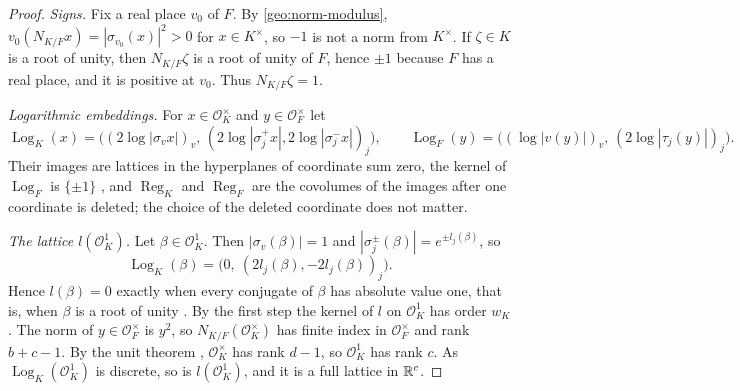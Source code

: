 \begin{proof}
\emph{Signs.} Fix a real place $v_0$ of $F$. By
\eqref{geo:norm-modulus}, $v_0(N_{K/F}x)=|\sigma_{v_0}(x)|^2>0$ for
$x\in K^\times$, so $-1$ is not a norm from $K^\times$. If $\zeta\in K$
is a root of unity, then $N_{K/F}\zeta$ is a root of unity of $F$,
hence $\pm1$ because $F$ has a real place, and it is positive at $v_0$.
Thus $N_{K/F}\zeta=1$.

\emph{Logarithmic embeddings.} For $x\in\mathcal O_K^\times$ and
$y\in\mathcal O_F^\times$ let
\[
 \operatorname{Log}_K(x)=\bigl((2\log|\sigma_vx|)_v,\,(2\log|\sigma_j^+x|,
 2\log|\sigma_j^-x|)_j\bigr),\qquad
 \operatorname{Log}_F(y)=\bigl((\log|v(y)|)_v,\,(2\log|\tau_j(y)|)_j\bigr).
\]
Their images are lattices in the hyperplanes of coordinate sum zero,
the kernel of $\operatorname{Log}_F$ is $\{\pm1\}$
\cite[Proposition~5.8]{MilneANT}, and $\operatorname{Reg}_K$ and
$\operatorname{Reg}_F$ are the covolumes of the images after one
coordinate is deleted; the choice of the deleted coordinate does not
matter.

\emph{The lattice $l(\mathcal O_K^1)$.} Let $\beta\in\mathcal O_K^1$. Then
$|\sigma_v(\beta)|=1$ and $|\sigma_j^\pm(\beta)|=e^{\pm l_j(\beta)}$, so
\[
 \operatorname{Log}_K(\beta)=\bigl(0,\ (2l_j(\beta),-2l_j(\beta))_j\bigr).
\]
Hence $l(\beta)=0$ exactly when every conjugate of $\beta$ has absolute
value one, that is, when $\beta$ is a root of unity
\cite[Corollary~5.6]{MilneANT}. By the first step the kernel of $l$ on
$\mathcal O_K^1$ has order $w_K$. The norm of $y\in\mathcal O_F^\times$
is $y^2$, so $N_{K/F}(\mathcal O_K^\times)$ has finite index in
$\mathcal O_F^\times$ and rank $b+c-1$. By the unit theorem
\cite[Theorem~5.1]{MilneANT}, $\mathcal O_K^\times$ has rank $d-1$, so
$\mathcal O_K^1$ has rank $c$. As $\operatorname{Log}_K(\mathcal O_K^1)$
is discrete, so is $l(\mathcal O_K^1)$, and it is a full lattice in
$\mathbb R^c$.


\end{proof}
